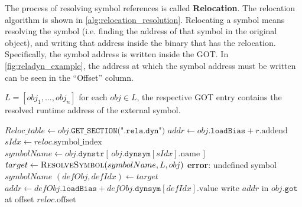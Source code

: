     The process of resolving symbol references is called \textbf{Relocation}. The relocation algorithm is shown in 
    \cref{alg:relocation_resolution}.
    Relocating a symbol means resolving the symbol (i.e. finding the address of that symbol in the original object), and writing 
    that address inside the binary that has the relocation.
    Specifically, the symbol address is written inside the \gls{GOT}.
    In \cref{fig:reladyn_example}, the address at which the symbol address must be written can be seen in the ``Offset'' column.
    \begin{algorithm}
        \caption{Relocation resolution at ELF load time}
        \label{alg:relocation_resolution}
        \begin{algorithmic}[1]
            \REQUIRE $L = [obj_1,\dots,obj_n]$ 
            \ENSURE for each $obj \in L$, the respective GOT entry contains the resolved runtime address of the external symbol.
            
                \STATE $Reloc\_table \gets obj.\texttt{GET\_SECTION(".rela.dyn")}$
                        \STATE $addr \gets obj.\texttt{loadBias} + r.\text{addend}$ 
                        \COMMENT{\textcolor{green!60!black}{The symbol does not need to be resolved. The address must be adjusted in order to enable ASLR}}
                    \ELSE
                            \STATE $sIdx \gets reloc.\text{symbol\_index}$
                            \STATE $symbolName \gets obj.\texttt{dynstr}[\, obj.\texttt{dynsym}[sIdx].\text{name} \,]$ 
                            \STATE $target \gets \textsc{ResolveSymbol}(symbolName, L, obj)$
                                \STATE \textbf{error}: undefined symbol $symbolName$ 
                            \ELSE
                                \STATE $(defObj, defIdx) \gets target$ 
                                \STATE $addr \gets defObj.\texttt{loadBias} + defObj.\texttt{dynsym}[defIdx].\text{value}$
                                \COMMENT{\small \textcolor{green!60!black}{The address of the resolved symbol is computed as base\_address (of the object that exports the symbol) plus the offset at which the symbol is stored}}
                            \ENDIF
                        \ENDIF
                    \ENDIF
                    \STATE write $addr$ in $obj.\texttt{got}$ at offset $reloc.\text{offset}$ \COMMENT{\small \textcolor{green!60!black}{The destination address at which to write the resolved symbol address is specified in the relocation entry}}
                \ENDFOR
            \ENDFOR
        \end{algorithmic}
        

\end{algorithm}
